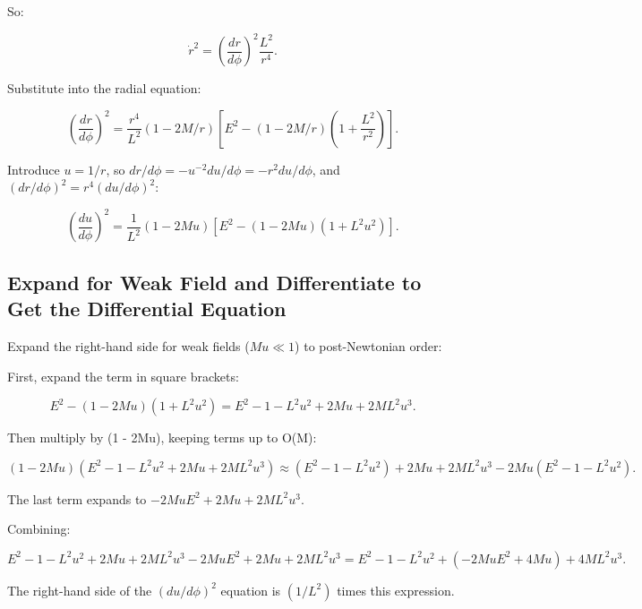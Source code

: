 \documentclass{article}
\begin{document}
So:

\begin{equation}
 \dot{r}^2 = \left(\frac{dr}{d\phi}\right)^2 \frac{L^2}{r^4}.
\end{equation}

Substitute into the radial equation:

\begin{equation}
 \left(\frac{dr}{d\phi}\right)^2 = \frac{r^4}{L^2} (1 - 2M/r) \left[ E^2 - (1 - 2M/r) \left(1 + \frac{L^2}{r^2}\right) \right].
\end{equation}

Introduce \(u = 1/r\), so \( dr / d\phi = - u^{-2} du / d\phi = - r^2 du / d\phi \), and \((dr/d\phi)^2 = r^4 (du/d\phi)^2\):

\begin{equation}
 \left(\frac{du}{d\phi}\right)^2 = \frac{1}{L^2} (1 - 2Mu) \left[ E^2 - (1 - 2Mu) (1 + L^2 u^2) \right].
\end{equation}

\subsection{Expand for Weak Field and Differentiate to Get the Differential Equation}

Expand the right-hand side for weak fields (\(M u \ll 1\)) to post-Newtonian order:

First, expand the term in square brackets:

\begin{equation}
 E^2 - (1 - 2Mu) (1 + L^2 u^2) = E^2 - 1 - L^2 u^2 + 2Mu + 2M L^2 u^3.
\end{equation}

Then multiply by (1 - 2Mu), keeping terms up to O(M):

\begin{equation}
 (1 - 2Mu) (E^2 - 1 - L^2 u^2 + 2Mu + 2M L^2 u^3) \approx (E^2 - 1 - L^2 u^2) + 2Mu + 2M L^2 u^3 - 2Mu (E^2 - 1 - L^2 u^2).
\end{equation}

The last term expands to \(-2Mu E^2 + 2Mu + 2M L^2 u^3\).

Combining:

\begin{equation}
 E^2 - 1 - L^2 u^2 + 2Mu + 2M L^2 u^3 - 2Mu E^2 + 2Mu + 2M L^2 u^3 = E^2 - 1 - L^2 u^2 + (-2Mu E^2 + 4Mu) + 4M L^2 u^3.
\end{equation}

The right-hand side of the \((du/d\phi)^2\) equation is \((1/L^2)\) times this expression.
\end{document}

